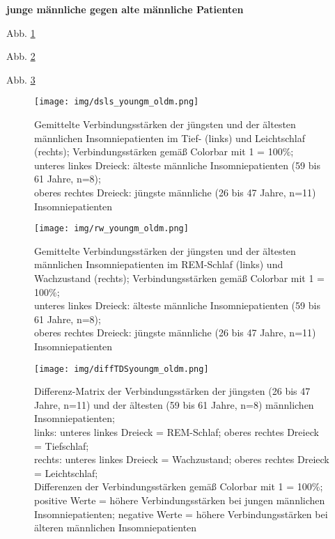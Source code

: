 \textbf{junge männliche gegen alte männliche Patienten}

Abb. \ref{fig:dsls_youngm_oldm}

Abb. \ref{fig:rw_youngm_oldm}

Abb. \ref{fig:diffTDSyoungm_oldm}

\begin{figure}[H]
	\centering
	\texttt{[image: img/dsls\_youngm\_oldm.png]}
	\caption[Verbindungsstärken der jüngsten und der ältesten männlichen Insomniepatienten im Tief- und Leichtschlaf]{Gemittelte Verbindungsstärken der jüngsten und der ältesten männlichen Insomniepatienten im Tief- (links) und Leichtschlaf (rechts); Verbindungsstärken gemäß Colorbar mit 1 = 100\%;\\unteres linkes Dreieck: älteste männliche Insomniepatienten (59 bis 61 Jahre, n=8);\\oberes rechtes Dreieck: jüngste männliche (26 bis 47 Jahre, n=11) Insomniepatienten}
	\label{fig:dsls_youngm_oldm}
\end{figure}

\begin{figure}[H]
	\centering
	\texttt{[image: img/rw\_youngm\_oldm.png]}
	\caption[Verbindungsstärken der jüngsten und der ältesten männlichen Insomniepatienten im REM-Schlaf und Wachzustand]{Gemittelte Verbindungsstärken der jüngsten und der ältesten männlichen Insomniepatienten im REM-Schlaf (links) und Wachzustand (rechts); Verbindungsstärken gemäß Colorbar mit 1 = 100\%;\\unteres linkes Dreieck: älteste männliche Insomniepatienten (59 bis 61 Jahre, n=8);\\oberes rechtes Dreieck: jüngste männliche (26 bis 47 Jahre, n=11) Insomniepatienten}
	\label{fig:rw_youngm_oldm}
\end{figure}

\begin{figure}[H]
	\centering
	\texttt{[image: img/diffTDSyoungm\_oldm.png]}
	\caption[Differenz-Matrix der Verbindungsstärken der jüngsten und ältesten männlichen Insomniepatienten]{Differenz-Matrix der Verbindungsstärken der jüngsten (26 bis 47 Jahre, n=11) und der ältesten (59 bis 61 Jahre, n=8) männlichen Insomniepatienten;\\links: unteres linkes Dreieck = REM-Schlaf; oberes rechtes Dreieck = Tiefschlaf;\\rechts: unteres linkes Dreieck = Wachzustand; oberes rechtes Dreieck = Leichtschlaf;\\Differenzen der Verbindungsstärken gemäß Colorbar mit 1 = 100\%;\\positive Werte = höhere Verbindungsstärken bei jungen männlichen Insomniepatienten; negative Werte = höhere Verbindungsstärken bei älteren männlichen Insomniepatienten}
	\label{fig:diffTDSyoungm_oldm}
\end{figure}



